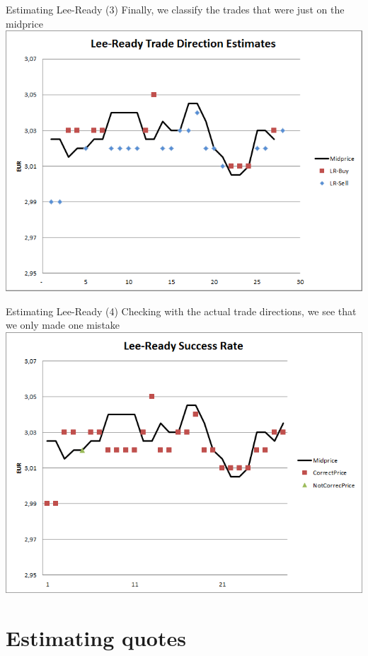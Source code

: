 \begin{frame}{Estimating Lee-Ready (3)}
	Finally, we classify the trades that were just on the midprice
	\center
	\includegraphics[scale=0.39]{pics/L2_leereadyest}
\end{frame}


\begin{frame}{Estimating Lee-Ready (4)}
	Checking with the actual trade directions, we see that we only made one mistake
	\center
	\includegraphics[scale=0.39]{pics/L2_leereadysuccess}
\end{frame}



\section{Estimating quotes}

